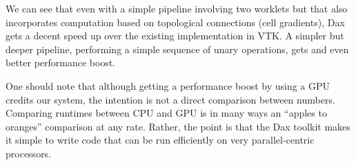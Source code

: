 \documentclass{vgtc}                          %
\begin{document}


We can see that even with a simple pipeline involving two worklets but that
also incorporates computation based on topological connections (cell
gradients), Dax gets a decent speed up over the existing implementation in
VTK.  A simpler but deeper pipeline, performing a simple sequence of unary
operations, gets and even better performance boost.

One should note that although getting a performance boost by using a GPU
credits our system,  the intention is not a direct comparison between
numbers.  Comparing runtimes between CPU and GPU is in many ways an
``apples to oranges'' comparison at any rate.  Rather, the point is that
the Dax toolkit makes it simple to write code that can be run efficiently
on very parallel-centric processors.
\end{document}
